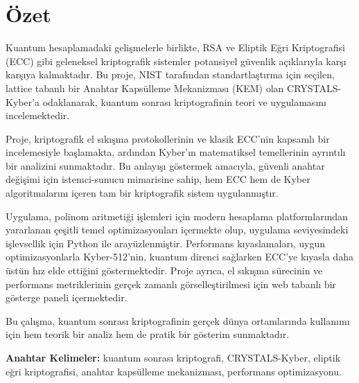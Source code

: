 \chapter*{Özet}

Kuantum hesaplamadaki gelişmelerle birlikte, RSA ve Eliptik Eğri Kriptografisi (ECC) gibi geleneksel kriptografik sistemler potansiyel güvenlik açıklarıyla karşı karşıya kalmaktadır. Bu proje, NIST tarafından standartlaştırma için seçilen, lattice tabanlı bir Anahtar Kapsülleme Mekanizması (KEM) olan CRYSTALS-Kyber’a odaklanarak, kuantum sonrası kriptografinin teori ve uygulamasını incelemektedir.

Proje, kriptografik el sıkışma protokollerinin ve klasik ECC’nin kapsamlı bir incelemesiyle başlamakta, ardından Kyber’ın matematiksel temellerinin ayrıntılı bir analizini sunmaktadır. Bu anlayışı göstermek amacıyla, güvenli anahtar değişimi için istemci-sunucu mimarisine sahip, hem ECC hem de Kyber algoritmalarını içeren tam bir kriptografik sistem uygulanmıştır.

Uygulama, polinom aritmetiği işlemleri için modern hesaplama platformlarından yararlanan çeşitli temel optimizasyonları içermekte olup, uygulama seviyesindeki işlevsellik için Python ile arayüzlenmiştir. Performans kıyaslamaları, uygun optimizasyonlarla Kyber-512’nin, kuantum direnci sağlarken ECC’ye kıyasla daha üstün hız elde ettiğini göstermektedir. Proje ayrıca, el sıkışma sürecinin ve performans metriklerinin gerçek zamanlı görselleştirilmesi için web tabanlı bir gösterge paneli içermektedir.

Bu çalışma, kuantum sonrası kriptografinin gerçek dünya ortamlarında kullanımı için hem teorik bir analiz hem de pratik bir gösterim sunmaktadır.


\vfill
\textbf{Anahtar Kelimeler:} kuantum sonrası kriptografi, CRYSTALS-Kyber, eliptik eğri kriptografisi, anahtar kapsülleme mekanizması, performans optimizasyonu.
\clearpage